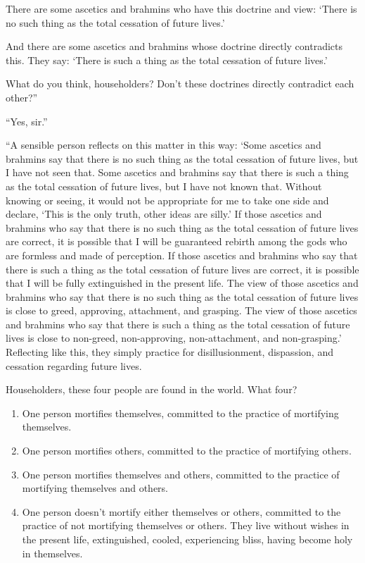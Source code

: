\documentclass[12pt,openany]{book}%
\begin{document}
There are some ascetics and brahmins who have this doctrine and view: ‘There is no such thing as the total cessation of future lives.’ 

And there are some ascetics and brahmins whose doctrine directly contradicts this. They say: ‘There is such a thing as the total cessation of future lives.’ 

What do you think, householders? Don’t these doctrines directly contradict each other?” 

“Yes, sir.” 

“A sensible person reflects on this matter in this way: ‘Some ascetics and brahmins say that there is no such thing as the total cessation of future lives, but I have not seen that. Some ascetics and brahmins say that there is such a thing as the total cessation of future lives, but I have not known that. Without knowing or seeing, it would not be appropriate for me to take one side and declare, ‘This is the only truth, other ideas are silly.’ If those ascetics and brahmins who say that there is no such thing as the total cessation of future lives are correct, it is possible that I will be guaranteed rebirth among the gods who are formless and made of perception. If those ascetics and brahmins who say that there is such a thing as the total cessation of future lives are correct, it is possible that I will be fully extinguished in the present life. The view of those ascetics and brahmins who say that there is no such thing as the total cessation of future lives is close to greed, approving, attachment, and grasping. The view of those ascetics and brahmins who say that there is such a thing as the total cessation of future lives is close to non-greed, non-approving, non-attachment, and non-grasping.’ Reflecting like this, they simply practice for disillusionment, dispassion, and cessation regarding future lives. 

Householders, these four people are found in the world. What four? 

\begin{enumerate}%
\item One person mortifies themselves, committed to the practice of mortifying themselves. %
\item One person mortifies others, committed to the practice of mortifying others. %
\item One person mortifies themselves and others, committed to the practice of mortifying themselves and others. %
\item One person doesn’t mortify either themselves or others, committed to the practice of not mortifying themselves or others. They live without wishes in the present life, extinguished, cooled, experiencing bliss, having become holy in themselves. %
\end{enumerate}
\end{document}
